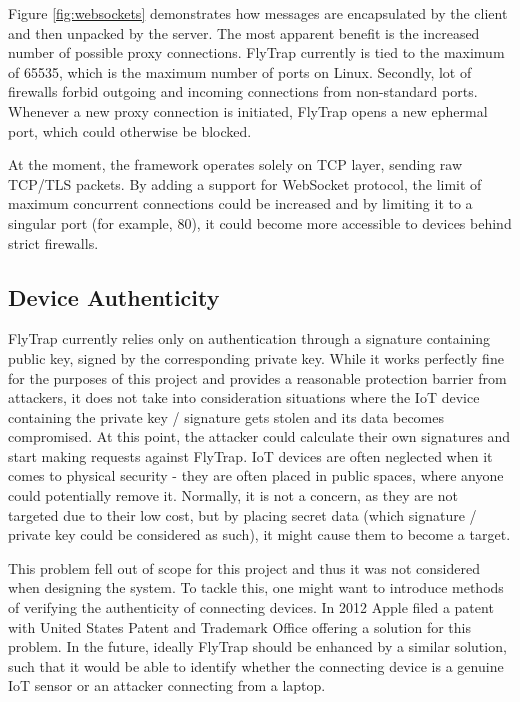 Figure \ref{fig:websockets} demonstrates how messages are encapsulated by the client and then unpacked by the server. The most apparent benefit is the increased number of possible proxy connections. FlyTrap currently is tied to the maximum of 65535, which is the maximum number of ports on Linux. Secondly, lot of firewalls forbid outgoing and incoming connections from non-standard ports. Whenever a new proxy connection is initiated, FlyTrap opens a new ephermal port, which could otherwise be blocked.

At the moment, the framework operates solely on TCP layer, sending raw TCP/TLS packets. By adding a support for WebSocket protocol, the limit of maximum concurrent connections could be increased and by limiting it to a singular port (for example, 80), it could become more accessible to devices behind strict firewalls.
\subsection{Device Authenticity}
FlyTrap currently relies only on authentication through a signature containing public key, signed by the corresponding private key. While it works perfectly fine for the purposes of this project and provides a reasonable protection barrier from attackers, it does not take into consideration situations where the IoT device containing the private key / signature gets stolen and its data becomes compromised. At this point, the attacker could calculate their own signatures and start making requests against FlyTrap. IoT devices are often neglected when it comes to physical security - they are often placed in public spaces, where anyone could potentially remove it. Normally, it is not a concern, as they are not targeted due to their low cost, but by placing secret data (which signature / private key could be considered as such), it might cause them to become a target.

This problem fell out of scope for this project and thus it was not considered when designing the system. To tackle this, one might want to introduce methods of verifying the authenticity of connecting devices. In 2012 Apple filed a patent with United States Patent and Trademark Office \cite{omernick2012systems} offering a solution for this problem. In the future, ideally FlyTrap should be enhanced by a similar solution, such that it would be able to identify whether the connecting device is a genuine IoT sensor or an attacker connecting from a laptop.